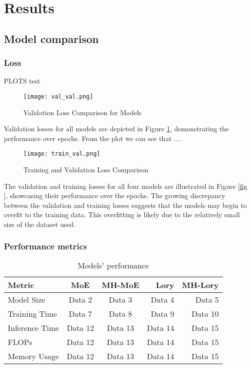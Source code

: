 \documentclass[12pt]{article}
\begin{document}
\section{Results}

\subsection{Model comparison}
\subsubsection{Loss}
 PLOTS test

\begin{figure}[H]
    \centering
    \texttt{[image: val\_val.png]}
    \caption{Validation Loss Comparison for Models}
    \label{fig:validation_loss}
\end{figure}

Validation losses for all models are depicted in Figure \ref{fig:validation_loss}, demonstrating the performance over epochs. From the plot we can see that ....

\begin{figure}[H]
    \centering
    \texttt{[image: train\_val.png]}
    \caption{Training and Validation Loss Comparison}
    \label{fig:train_val_loss}
\end{figure}

The validation and training losses for all four models are illustrated in Figure \ref{fig
}, showcasing their performance over the epochs. The growing discrepancy between the validation and training losses suggests that the models may begin to overfit to the training data. This overfitting is likely due to the relatively small size of the dataset used.

\subsubsection{Performance metrics}

\begin{table}[h!]
\centering
\begin{tabular}{|l|c|c|r|r|}
\hline
Metric & \textbf{MoE} & \textbf{MH-MoE} & \textbf{Lory} & \textbf{MH-Lory} \\
\hline
Model Size & Data 2 & Data 3 & Data 4 & Data 5 \\
Training Time & Data 7 & Data 8 & Data 9 & Data 10 \\
Inference Time  & Data 12 & Data 13 & Data 14 & Data 15 \\
FLOPs & Data 12 & Data 13 & Data 14 & Data 15 \\
Memory Usage & Data 12 & Data 13 & Data 14 & Data 15 \\

\hline
\end{tabular}
\caption{Models' performance}
\label{tab:performance_table}
\end{table}
\end{document}
